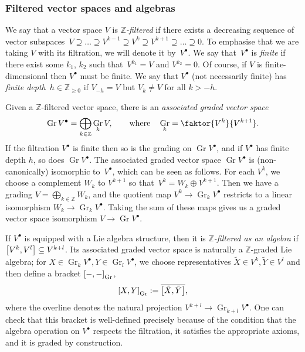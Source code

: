 \documentclass[11pt]{article}
\numberwithin{equation}{section}
\numberwithin{equation}{section}
\newcommand{\ZZ}{\mathbb{Z}}
\newcommand{\1}{\mathbbm{1}}
\DeclareMathOperator{\Gr}{Gr}
\begin{document}
\subsubsection{Filtered vector spaces and algebras}
\label{sec:filtered-alg}

We say that a vector space $V$ is \emph{$\ZZ$-filtered} if there exists a decreasing sequence of vector subspaces~${V \supseteq \dots \supseteq V^{k-1} \supseteq V^k \supseteq V^{k+1} \supseteq \dots \supseteq 0}$.
To emphasise that we are taking $V$ with its filtration, we will denote it by~$V^\bullet$. We say that~$V^\bullet$ is \emph{finite} if there exist some $k_1$, $k_2$ such that~${V^{k_1}=V}$ and $V^{k_2}=0$. Of course, if $V$ is finite-dimensional then $V^\bullet$ must be finite. We say that $V^\bullet$ (not necessarily finite) has \emph{finite depth}~${h\in\ZZ_{\geq 0}}$ if $V_{-h} = V$ but $V_k\neq V$ for all $k>-h$.

Given a $\ZZ$-filtered vector space, there is an \emph{associated graded vector space}
\[
	\Gr V^\bullet = \bigoplus_{k\in\ZZ} \Gr_k V,\qquad \text{where}\quad \Gr_k = \faktor{V^k}{V^{k+1}}.
\]
If the filtration $V^\bullet$ is finite then so is the grading on $\Gr V^\bullet$, and if $V^\bullet$ has finite depth $h$, so does $\Gr V^\bullet$. The associated graded vector space $\Gr V^\bullet$ is (non-canonically) isomorphic to~$V^\bullet$, which can be seen as follows. For each $V^k$, we choose a complement $W_k$ to $V^{k+1}$ so that~${V^k=W_k\oplus V^{k+1}}$. Then we have a grading $V=\bigoplus_{k\in\ZZ} W_k$, and the quotient map $V^k\to\Gr_k V^\bullet$ restricts to a linear isomorphism $W_k\to\Gr_kV^\bullet$. Taking the sum of these maps gives us a graded vector space isomorphism $V\to\Gr V^\bullet $.

If $V^\bullet$ is equipped with a Lie algebra structure, then it is \emph{$\ZZ$-filtered as an algebra} if $\comm{V^k}{V^l}\subseteq V^{k+l}$. Its associated graded vector space is naturally a $\ZZ$-graded Lie algebra; for $X\in \Gr_k V^\bullet, Y\in \Gr_l V^\bullet$, we choose representatives $\tilde{X}\in V^k,\tilde{Y}\in V^l$ and then define a bracket $\comm{-}{-}_{\mathrm{Gr}}$,
\[
	\comm{X}{Y}_{\mathrm{Gr}} := \overline{\big[\tilde{X},\tilde{Y}\big]},
\]
where the overline denotes the natural projection $V^{k+l}\to\Gr_{k+l}V^\bullet$. One can check that this bracket is well-defined precisely because of the condition that the algebra operation on $V^\bullet$ respects the filtration, it satisfies the appropriate axioms, and it is graded by construction.
\end{document}
